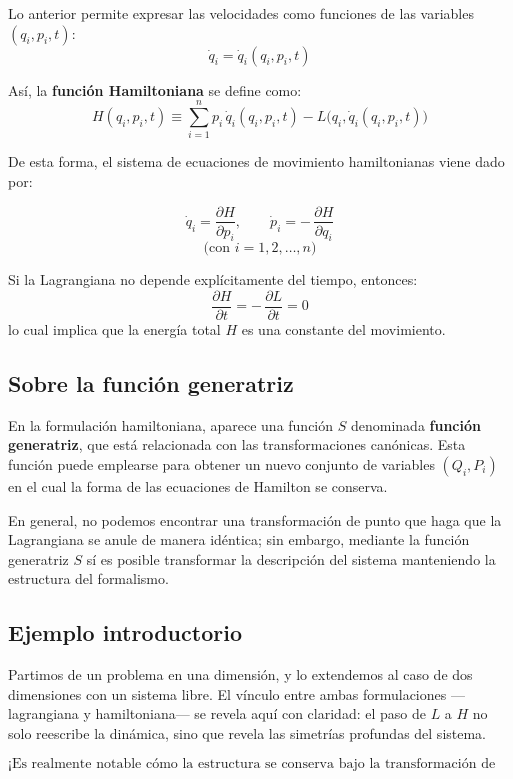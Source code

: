 \documentclass{article}
\begin{document}
Lo anterior permite expresar las velocidades como funciones de las variables \((q_i, p_i, t)\):
\[
\dot{q}_i = \dot{q}_i(q_i, p_i, t)
\]

Así, la \textbf{función Hamiltoniana} se define como:
\[
H(q_i, p_i, t) \equiv \sum_{i=1}^{n} p_i\,\dot{q}_i(q_i, p_i, t) - L\big(q_i, \dot{q}_i(q_i, p_i, t)\big)
\]

\noindent
De esta forma, el sistema de ecuaciones de movimiento hamiltonianas viene dado por:

\[
\boxed{
\dot{q}_{i} = \frac{\partial H}{\partial p_{i}},
\qquad
\dot{p}_{i} = -\,\frac{\partial H}{\partial q_{i}}
}
\]
\[
\text{(con } i = 1, 2, \dots, n)
\]

Si la Lagrangiana no depende explícitamente del tiempo, entonces:
\[
\frac{\partial H}{\partial t} = -\,\frac{\partial L}{\partial t} = 0
\]
lo cual implica que la energía total \(H\) es una constante del movimiento.

\subsection{Sobre la función generatriz}

En la formulación hamiltoniana, aparece una función \(S\) denominada \textbf{función generatriz}, que está relacionada con las transformaciones canónicas. 
Esta función puede emplearse para obtener un nuevo conjunto de variables \((Q_i, P_i)\) en el cual la forma de las ecuaciones de Hamilton se conserva.

En general, no podemos encontrar una transformación de punto que haga que la Lagrangiana se anule de manera idéntica; sin embargo, 
mediante la función generatriz \(S\) sí es posible transformar la descripción del sistema manteniendo la estructura del formalismo.

\subsection{Ejemplo introductorio}

Partimos de un problema en una dimensión, y lo extendemos al caso de dos dimensiones con un sistema libre. 
El vínculo entre ambas formulaciones —lagrangiana y hamiltoniana— se revela aquí con claridad: 
el paso de \(L\) a \(H\) no solo reescribe la dinámica, sino que revela las simetrías profundas del sistema.

\[
\text{¡Es realmente notable cómo la estructura se conserva bajo la transformación de Legendre!}
\]
\end{document}

